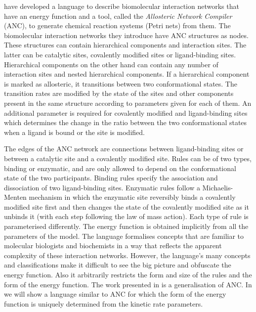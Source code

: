 \citet{anc} have developed a language
to describe biomolecular interaction networks
that have an energy function
and a tool, called the \emph{Allosteric Network Compiler} (ANC),
to generate chemical reaction systems (\ie Petri nets) from them.
The biomolecular interaction networks they introduce
have ANC structures as nodes.
These structures can contain hierarchical components and
interaction sites. %
The latter can be catalytic sites,
covalently modified sites or ligand-binding sites.
Hierarchical components on the other hand
can contain any number of interaction sites
and nested hierarchical components.
If a hierarchical component is marked as allosteric,
it transitions between two conformational states.
The transition rates are modified by the state of the sites
and other components present in the same structure
according to parameters given for each of them.
An additional parameter is required for covalently modified
and ligand-binding sites which determines the change in the ratio
between the two conformational states when a ligand is bound
or the site is modified.

The edges of the ANC network
are connections between ligand-binding sites
or between a catalytic site and a covalently modified site.
Rules can be of two types, binding or enzymatic,
and are only allowed to depend on
the conformational state of the two participants.
Binding rules specify the association and dissociation of
two ligand-binding sites.
Enzymatic rules follow a Michaelis-Menten mechanism in which
the enzymatic site reversibly binds a covalently modified site first
and then changes the state of the covalently modified site
as it unbinds it (with each step following the law of mass action).
Each type of rule is parameterised differently.
The energy function is obtained implicitly
from all the parameters of the model.
The language formalises concepts that are familiar to
molecular biologists and biochemists
in a way that reflects the apparent complexity
of these interaction networks.
However, the language's many concepts and classifications
make it difficult to see the big picture
and obfuscate the energy function. %
Also it arbitrarily restricts the form and size of the rules
and the form of the energy function.
The work presented in  is a generalisation of ANC.
In  we will show a language similar to ANC
for which the form of the energy function is uniquely determined
from the kinetic rate parameters.

